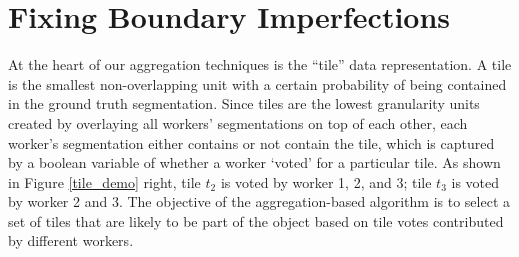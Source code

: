\vspace{-15pt}
\section{Fixing Boundary Imperfections\label{precision}}%
At the heart of our aggregation techniques is the ``tile'' data representation. A tile is the smallest non-overlapping unit with a certain probability of being contained in the ground truth segmentation. Since tiles are the lowest granularity units created by overlaying all workers' segmentations on top of each other, each worker's segmentation either contains or not contain the tile, which is captured by a boolean variable of whether a worker `voted' for a particular tile. As shown in Figure \ref{tile_demo} right, tile $t_2$ is voted by worker 1, 2, and 3; tile $t_3$ is voted by  worker 2 and 3. The objective of the aggregation-based algorithm is to select a set of tiles that are likely to be part of the object based on tile votes contributed by different workers.


